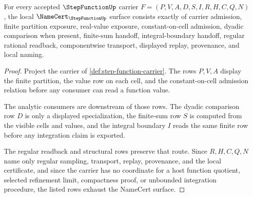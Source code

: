 \begin{theorem}
\label{thm:step-function-namecert-obligations}
For every accepted $\StepFunctionUp$ carrier $F=(P,V,A,D,S,I,R,H,C,Q,N)$, the local $\NameCert_{\StepFunctionUp}$ surface consists exactly of carrier admission, finite partition exposure, real-value exposure, constant-on-cell admission, dyadic comparison when present, finite-sum handoff, integral-boundary handoff, regular rational readback, componentwise transport, displayed replay, provenance, and local naming.
\end{theorem}
\begin{proof}
Project the carrier of \autoref{def:step-function-carrier}. The rows $P,V,A$ display the finite partition, the value row on each cell, and the constant-on-cell admission relation before any consumer can read a function value.

The analytic consumers are downstream of those rows. The dyadic comparison row $D$ is only a displayed specialization, the finite-sum row $S$ is computed from the visible cells and values, and the integral boundary $I$ reads the same finite row before any integration claim is exported.

The regular readback and structural rows preserve that route. Since $R,H,C,Q,N$ name only regular sampling, transport, replay, provenance, and the local certificate, and since the carrier has no coordinate for a host function quotient, selected refinement limit, compactness proof, or unbounded integration procedure, the listed rows exhaust the NameCert surface.
\end{proof}

